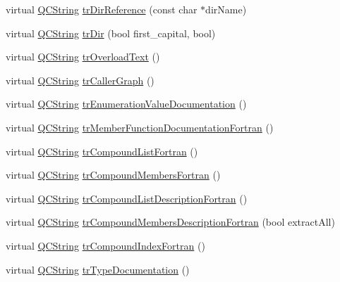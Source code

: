 \begin{DoxyCompactItemize}
virtual \mbox{\hyperlink{class_q_c_string}{Q\+C\+String}} \mbox{\hyperlink{class_translator_vietnamese_acaafc303a705375b5fd709deb1985d1f}{tr\+Dir\+Reference}} (const char $\ast$dir\+Name)
\item 
virtual \mbox{\hyperlink{class_q_c_string}{Q\+C\+String}} \mbox{\hyperlink{class_translator_vietnamese_ac229e326629a65442b5acc0462e78464}{tr\+Dir}} (bool first\+\_\+capital, bool)
\item 
virtual \mbox{\hyperlink{class_q_c_string}{Q\+C\+String}} \mbox{\hyperlink{class_translator_vietnamese_a888bc508ba4d11c3700aedc47836dc53}{tr\+Overload\+Text}} ()
\item 
virtual \mbox{\hyperlink{class_q_c_string}{Q\+C\+String}} \mbox{\hyperlink{class_translator_vietnamese_a4ce284193b5fe011519621c28e60037c}{tr\+Caller\+Graph}} ()
\item 
virtual \mbox{\hyperlink{class_q_c_string}{Q\+C\+String}} \mbox{\hyperlink{class_translator_vietnamese_a7135d41ed09f9679170644718a05229b}{tr\+Enumeration\+Value\+Documentation}} ()
\item 
virtual \mbox{\hyperlink{class_q_c_string}{Q\+C\+String}} \mbox{\hyperlink{class_translator_vietnamese_a24130d70d4b811186de1ec993a8b5215}{tr\+Member\+Function\+Documentation\+Fortran}} ()
\item 
virtual \mbox{\hyperlink{class_q_c_string}{Q\+C\+String}} \mbox{\hyperlink{class_translator_vietnamese_a6df077481654e3d6e831db6dfff0d0cc}{tr\+Compound\+List\+Fortran}} ()
\item 
virtual \mbox{\hyperlink{class_q_c_string}{Q\+C\+String}} \mbox{\hyperlink{class_translator_vietnamese_a02e7fee95bb3d99bb65de305dc0e9a7c}{tr\+Compound\+Members\+Fortran}} ()
\item 
virtual \mbox{\hyperlink{class_q_c_string}{Q\+C\+String}} \mbox{\hyperlink{class_translator_vietnamese_a3a3ae7bbb099fc4a882b6a311525a22b}{tr\+Compound\+List\+Description\+Fortran}} ()
\item 
virtual \mbox{\hyperlink{class_q_c_string}{Q\+C\+String}} \mbox{\hyperlink{class_translator_vietnamese_a505d25947ec5f796e862d507d42b86e2}{tr\+Compound\+Members\+Description\+Fortran}} (bool extract\+All)
\item 
virtual \mbox{\hyperlink{class_q_c_string}{Q\+C\+String}} \mbox{\hyperlink{class_translator_vietnamese_af77682122b155e51ca9d58bf628597f8}{tr\+Compound\+Index\+Fortran}} ()
\item 
virtual \mbox{\hyperlink{class_q_c_string}{Q\+C\+String}} \mbox{\hyperlink{class_translator_vietnamese_ac4460faa1395d7a6929defead0f8c28b}{tr\+Type\+Documentation}} ()

\end{DoxyCompactItemize}
